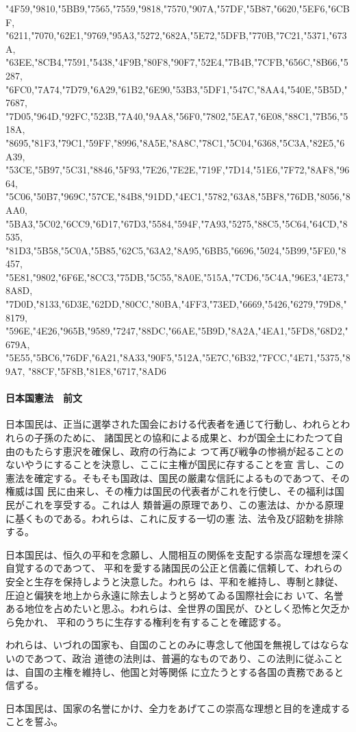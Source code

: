 \documentclass{ltjsarticle}
\begin{document}
{  "4F59,"9810,"5BB9,"7565,"7559,"9818,"7570,"907A,"57DF,"5B87,"6620,"5EF6,"6CBF,
  "6211,"7070,"62E1,"9769,"95A3,"5272,"682A,"5E72,"5DFB,"770B,"7C21,"5371,"673A,
  "63EE,"8CB4,"7591,"5438,"4F9B,"80F8,"90F7,"52E4,"7B4B,"7CFB,"656C,"8B66,"5287,
  "6FC0,"7A74,"7D79,"6A29,"61B2,"6E90,"53B3,"5DF1,"547C,"8AA4,"540E,"5B5D,"7687,
  "7D05,"964D,"92FC,"523B,"7A40,"9AA8,"56F0,"7802,"5EA7,"6E08,"88C1,"7B56,"518A,
  "8695,"81F3,"79C1,"59FF,"8996,"8A5E,"8A8C,"78C1,"5C04,"6368,"5C3A,"82E5,"6A39,
  "53CE,"5B97,"5C31,"8846,"5F93,"7E26,"7E2E,"719F,"7D14,"51E6,"7F72,"8AF8,"9664,
  "5C06,"50B7,"969C,"57CE,"84B8,"91DD,"4EC1,"5782,"63A8,"5BF8,"76DB,"8056,"8AA0,
  "5BA3,"5C02,"6CC9,"6D17,"67D3,"5584,"594F,"7A93,"5275,"88C5,"5C64,"64CD,"8535,
  "81D3,"5B58,"5C0A,"5B85,"62C5,"63A2,"8A95,"6BB5,"6696,"5024,"5B99,"5FE0,"8457,
  "5E81,"9802,"6F6E,"8CC3,"75DB,"5C55,"8A0E,"515A,"7CD6,"5C4A,"96E3,"4E73,"8A8D,
  "7D0D,"8133,"6D3E,"62DD,"80CC,"80BA,"4FF3,"73ED,"6669,"5426,"6279,"79D8,"8179,
  "596E,"4E26,"965B,"9589,"7247,"88DC,"66AE,"5B9D,"8A2A,"4EA1,"5FD8,"68D2,"679A,
  "5E55,"5BC6,"76DF,"6A21,"8A33,"90F5,"512A,"5E7C,"6B32,"7FCC,"4E71,"5375,"89A7,
  "88CF,"5F8B,"81E8,"6717,"8AD6}

\paragraph{日本国憲法　前文}

{\selectfont
日本国民は、正当に選挙された国会における代表者を通じて行動し、われらとわれらの子孫のために、
諸国民との協和による成果と、わが国全土にわたつて自由のもたらす恵沢を確保し、政府の行為によ
つて再び戦争の惨禍が起ることのないやうにすることを決意し、ここに主権が国民に存することを宣
言し、この憲法を確定する。そもそも国政は、国民の厳粛な信託によるものであつて、その権威は国
民に由来し、その権力は国民の代表者がこれを行使し、その福利は国民がこれを享受する。これは人
類普遍の原理であり、この憲法は、かかる原理に基くものである。われらは、これに反する一切の憲
法、法令及び詔勅を排除する。

日本国民は、恒久の平和を念願し、人間相互の関係を支配する崇高な理想を深く自覚するのであつて、
平和を愛する諸国民の公正と信義に信頼して、われらの安全と生存を保持しようと決意した。われら
は、平和を維持し、専制と隷従、圧迫と偏狭を地上から永遠に除去しようと努めてゐる国際社会にお
いて、名誉ある地位を占めたいと思ふ。われらは、全世界の国民が、ひとしく恐怖と欠乏から免かれ、
平和のうちに生存する権利を有することを確認する。

われらは、いづれの国家も、自国のことのみに専念して他国を無視してはならないのであつて、政治
道徳の法則は、普遍的なものであり、この法則に従ふことは、自国の主権を維持し、他国と対等関係
に立たうとする各国の責務であると信ずる。

日本国民は、国家の名誉にかけ、全力をあげてこの崇高な理想と目的を達成することを誓ふ。
}
\end{document}

